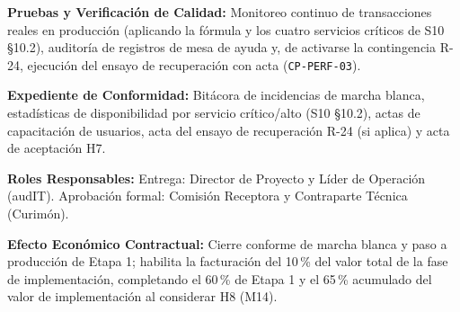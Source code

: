 \par\noindent\textbf{Pruebas y Verificación de Calidad:} Monitoreo continuo de transacciones reales en producción (aplicando la fórmula y los cuatro servicios críticos de S10 §10.2), auditoría de registros de mesa de ayuda y, de activarse la contingencia R-24, ejecución del ensayo de recuperación con acta (\texttt{CP-PERF-03}).\par
\par\noindent\textbf{Expediente de Conformidad:} Bitácora de incidencias de marcha blanca, estadísticas de disponibilidad por servicio crítico/alto (S10 §10.2), actas de capacitación de usuarios, acta del ensayo de recuperación R-24 (si aplica) y acta de aceptación H7.\par
\par\noindent\textbf{Roles Responsables:} Entrega: Director de Proyecto y Líder de Operación (audIT). Aprobación formal: Comisión Receptora y Contraparte Técnica (Curimón).\par
\par\noindent\textbf{Efecto Económico Contractual:} Cierre conforme de marcha blanca y paso a producción de Etapa 1; habilita la facturación del 10\,\% del valor total de la fase de implementación, completando el 60\,\% de Etapa 1 y el 65\,\% acumulado del valor de implementación al considerar H8 (M14).\par

